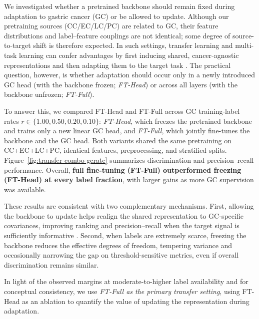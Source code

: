 \documentclass[diagnostics,article,submit,pdftex,moreauthors]{Definitions/mdpi}
\begin{document}
We investigated whether a pretrained backbone should remain fixed during adaptation to gastric cancer (GC) or be allowed to update. Although our pretraining sources (CC/EC/LC/PC) are related to GC, their feature distributions and label–feature couplings are not identical; some degree of source-to-target shift is therefore expected. In such settings, transfer learning and multi-task learning can confer advantages by first inducing shared, cancer-agnostic representations and then adapting them to the target task \citep{Caruana1997_MTL,Pan2010_TLsurvey,Yosinski2014_transferable}. The practical question, however, is whether adaptation should occur only in a newly introduced GC head (with the backbone frozen; \emph{FT-Head}) or across all layers (with the backbone unfrozen; \emph{FT-Full}).

To answer this, we compared FT-Head and FT-Full across GC training-label rates $r \in \{1.00, 0.50, 0.20, 0.10\}$: \emph{FT-Head}, which freezes the pretrained backbone and trains only a new linear GC head, and \emph{FT-Full}, which jointly fine-tunes the backbone and the GC head. Both variants shared the same pretraining on CC+EC+LC+PC, identical features, preprocessing, and stratified splits. 
Figure~\ref{fig:transfer-combo-gcrate} summarizes discrimination and precision–recall performance.
Overall, \textbf{full fine-tuning (FT-Full) outperformed freezing (FT-Head) at every label fraction}, with larger gains as more GC supervision was available.

These results are consistent with two complementary mechanisms. First, allowing the backbone to update helps realign the shared representation to GC-specific covariances, improving ranking and precision–recall when the target signal is sufficiently informative \citep{Pan2010_TLsurvey,Yosinski2014_transferable}. Second, when labels are extremely scarce, freezing the backbone reduces the effective degrees of freedom, tempering variance and occasionally narrowing the gap on threshold-sensitive metrics, even if overall discrimination remains similar.

In light of the observed margins at moderate-to-higher label availability and for conceptual consistency, we use \emph{FT-Full as the primary transfer setting}, using FT-Head as an ablation to quantify the value of updating the representation during adaptation.



\end{document}
